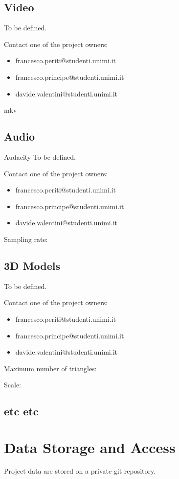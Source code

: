 \documentclass[12pt]{article}
\begin{document}
\subsection{Video}
To be defined.

Contact one of the project owners:
\begin{itemize}
	\item francesco.periti@studenti.unimi.it
	\item francesco.principe@studenti.unimi.it
	\item davide.valentini@studenti.unimi.it
\end{itemize}
mkv

\subsection{Audio}
Audacity
To be defined.

Contact one of the project owners:
\begin{itemize}
	\item francesco.periti@studenti.unimi.it
	\item francesco.principe@studenti.unimi.it
	\item davide.valentini@studenti.unimi.it
\end{itemize}
Sampling rate:

\subsection{3D Models}
To be defined.

Contact one of the project owners:
\begin{itemize}
	\item francesco.periti@studenti.unimi.it
	\item francesco.principe@studenti.unimi.it
	\item davide.valentini@studenti.unimi.it
\end{itemize}
Maximum number of triangles:

Scale: 

\subsection{etc etc}


\section{Data Storage and Access}
Project data are stored on a private git repository.
\end{document}
